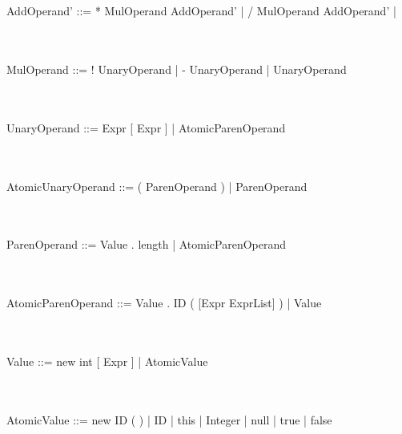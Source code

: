 \documentclass[a4paper,portrait,12pt]{article}
\begin{document}
\\~\\
AddOperand' ::=	* MulOperand AddOperand'		\newline
\hspace*{.625in} | / MulOperand	AddOperand' 	\newline
\hspace*{.625in} | \epsilon

\\~\\
MulOperand ::=	! UnaryOperand				\newline
\hspace*{.625in} | - UnaryOperand			\newline
\hspace*{.625in} | UnaryOperand				\newline


\\~\\
UnaryOperand ::=	Expr [ Expr ]			\newline
\hspace*{.625in} | AtomicParenOperand		\newline

\\~\\
AtomicUnaryOperand ::=	( ParenOperand )	\newline
\hspace*{.625in} | ParenOperand				\newline

\\~\\
ParenOperand ::=	Value . length          \newline
\hspace*{.625in} | AtomicParenOperand		\newline

\\~\\
AtomicParenOperand ::=	Value . ID ( [Expr ExprList] )	\newline
\hspace*{.625in} | Value					\newline

\\~\\
Value ::=	new int [ Expr ]			    \newline
\hspace*{.625in} | AtomicValue				\newline

\\~\\
AtomicValue ::=	new ID ( )				    \newline
\hspace*{.625in} | ID						\newline
\hspace*{.625in} | this   					\newline
\hspace*{.625in} | Integer					\newline
\hspace*{.625in} | null   					\newline
\hspace*{.625in} | true   					\newline
\hspace*{.625in} | false  					\newline
\end{document}
